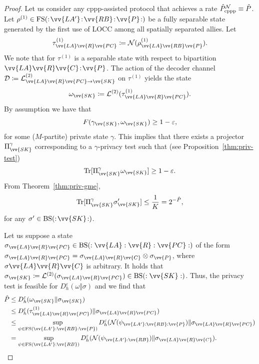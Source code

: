 \documentclass[aps,pra,twocolumn,superscriptaddress,longbibliography]{revtex4-1}
\def\Tr{\operatorname{Tr}}
\def\FS{\operatorname{FS}}
\def\BS{\operatorname{BS}}
\newcommand{\mc}[1]{\mathcal{#1}}
\begin{document}
\begin{proof}
Let us consider any cppp-assisted protocol that achieves a rate $\hat{P}_{\textnormal{cppp}}^{\mc{N}}\equiv \hat{P}$. Let $\rho^{(1)}\in\FS(:\!\vv{LA'}\!:\!\vv{RB}\!:\!\vv{P}\!:)$ be a fully separable state generated by the first use of LOCC among all spatially separated allies. Let 
\begin{equation}
\tau^{(1)}_{\vv{LA}\vv{R}\vv{PC}}\coloneqq \mc{N}(\rho^{(1)}_{\vv{LA}\vv{RB}\vv{P}}).
\end{equation}  
We note that for $\tau^{(1)}$ is a separable state with respect to bipartition $\vv{LA}\vv{R}\vv{C}\!:\!\vv{P}$. The action of the decoder channel $\mc{D}\coloneqq \mc{L}^{(2)}_{\vv{LA}\vv{R}\vv{PC}\to \vv{SK}}$ on $\tau^{(1)}$ yields the state
\begin{equation}
\omega_{\vv{SK}}\coloneqq \mc{L}^{(2)}(\tau^{(1)}_{\vv{LA}\vv{R}\vv{PC}}).
\end{equation}
By assumption we have that
\begin{equation}
F(\gamma_{\vv{SK}}, \omega_{\vv{SK}})\geq 1-\varepsilon,
\end{equation}
for some ($M$-partite) private state $\gamma$. This implies that there exists a projector $\Pi^\gamma_{\vv{SK}}$ corresponding to a $\gamma$-privacy test such that (see Proposition~\ref{thm:priv-test})
\begin{equation}
\Tr[\Pi^\gamma_{\vv{SK}}\omega_{\vv{SK}}]\geq 1-\varepsilon. 
\end{equation}
From Theorem~\ref{thm:priv-gme},
\begin{equation}
\Tr[\Pi^\gamma_{\vv{SK}}\sigma'_{\vv{SK}}]\leq \frac{1}{K}=2^{-\hat{P}},
\end{equation}
for any $\sigma'\in\BS(:\!\vv{SK}\!:)$. 

Let us suppose a state $\sigma_{\vv{LA}\vv{R}\vv{PC}}\in\BS(:\vv{LA}:\vv{R}:\vv{PC}:)$ of the form $\sigma_{\vv{LA}\vv{R}\vv{PC}}=\sigma_{\vv{LA}\vv{R}\vv{C}}\otimes\sigma_{\vv{P}}$, where $\sigma{\vv{LA}\vv{R}\vv{C}}$ is arbitrary. It holds that $\sigma_{\vv{SK}}\coloneqq \mc{L}^{(2)}(\sigma_{\vv{LA}\vv{R}\vv{PC}})\in\BS(:\vv{SK}:)$. Thus, the privacy test is feasible for $D^\varepsilon_h(\omega\Vert \sigma)$ and we find that
\begin{align}
\hat{P} &\leq D^\varepsilon_h(\omega_{\vv{SK}}\Vert \sigma_{\vv{SK}})\\
&\leq  D^\varepsilon_h(\tau^{(1)}_{\vv{LA}\vv{R}\vv{PC}})\Vert \sigma_{\vv{LA}\vv{R}\vv{PC}} )\label{eq:40}\\
&\leq \sup_{\psi\in\FS(\vv{LA'}:\vv{RB}:\vv{P})}D^\varepsilon_h(\mc{N}(\psi_{\vv{LA'}:\vv{RB}:\vv{P}})\Vert \sigma_{\vv{LA}\vv{R}\vv{PC}})\\
&= \sup_{\psi\in\FS(\vv{LA'}:\vv{RB})}D^\varepsilon_h(\mc{N}(\psi_{\vv{LA'}:\vv{RB}})\Vert \sigma_{\vv{LA}\vv{R}\vv{C}}).\label{eq:one-shot-proof-part}
\end{align}


\end{proof}
\end{document}
